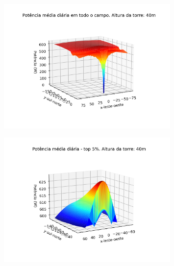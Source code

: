 \documentclass[12pt,notheorems,hyperref={pdfauthor= Rafael Nardi}]{beamer}
\begin{document}
\begin{frame}%
	\begin{figure}[htpb]
		\centering
		\includegraphics[width=0.8\textwidth]{../../plots/tower_shadow_correction/square_grid_along_day_40mfull_grid.png}
		\label{fig:heliost_field_average_40m}
	\end{figure}
\end{frame}

\begin{frame}%
	\begin{figure}[htpb]
		\centering
		\includegraphics[width=0.8\textwidth]{../../plots/tower_shadow_correction/square_grid_along_day_40mtop_5_most_powerfull.png}
		\label{fig:heliost_field_average_40m_top5}
	\end{figure}
\end{frame}
\end{document}
